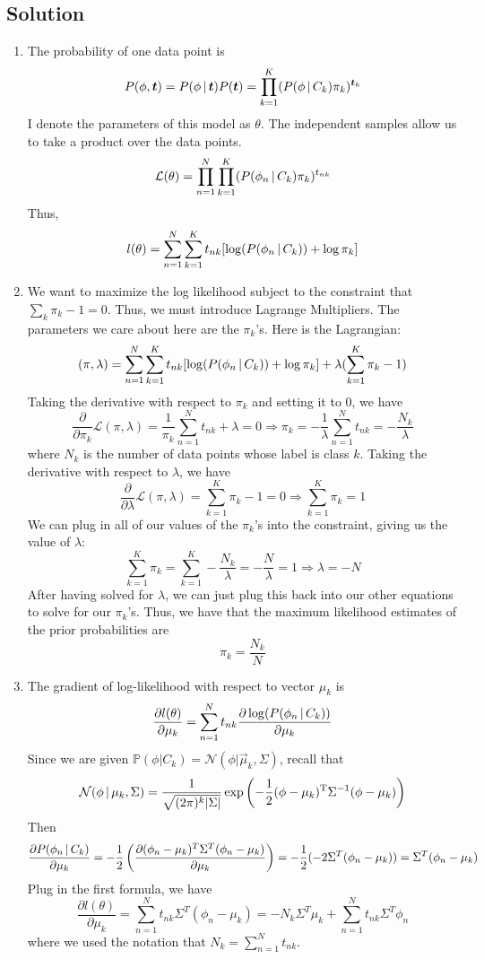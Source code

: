 \documentclass[submit]{harvardml}
\begin{document}
\subsection*{Solution}
\begin{enumerate}
    \item The probability of one data point is
    $$ P(\phi, \boldsymbol{t}) = P(\phi \,|\, \boldsymbol{t}) P(\boldsymbol{t}) = \prod_{k=1}^K (P(\phi \,|\, C_k) \pi_k)^{\boldsymbol{t}_k} $$
    I denote the parameters of this model as $\theta$. The independent samples allow us to take a product over the data points.
    $$ \mathcal{L}(\theta) = \prod_{n=1}^{N}\prod_{k=1}^K (P(\phi_n \,|\, C_k) \pi_k)^{t_{nk}} $$
    Thus,
    $$ l(\theta) = \sum_{n=1}^{N} \sum_{k=1}^K t_{nk} [\log(P(\phi_n \,|\, C_k)) + \log\pi_k] $$
    
    \item We want to maximize the log likelihood subject to the constraint that $\sum_k\pi_k - 1 = 0$. Thus, we must introduce Lagrange Multipliers. The parameters we care about here are the $\pi_k$'s. Here is the Lagrangian:
    $$ \mathcal(\pi, \lambda) = \sum_{n=1}^{N} \sum_{k=1}^K t_{nk} [\log(P(\phi_n \,|\, C_k)) + \log\pi_k] + \lambda(\sum_{k=1}^K\pi_k - 1) $$
    Taking the derivative with respect to $\pi_k$ and setting it to 0, we have
    $$ \frac{\partial}{\partial \pi_k} \mathcal{L}(\pi, \lambda) = \frac{1}{\pi_k} \sum_{n=1}^N t_{nk} + \lambda = 0 \Rightarrow \pi_k = -\frac{1}{\lambda} \sum_{n=1}^N t_{nk} = -\frac{N_k}{\lambda} $$
    where $N_k$ is the number of data points whose label is class $k$. Taking the derivative with respect to $\lambda$, we have
    $$ \frac{\partial}{\partial \lambda} \mathcal{L}(\pi,\lambda) = \sum_{k=1}^K \pi_k - 1 = 0 \Rightarrow \sum_{k=1}^K \pi_k = 1 $$
    We can plug in all of our values of the $\pi_k$'s into the constraint, giving us the value of $\lambda$:
    $$ \sum_{k=1}^K \pi_k = \sum_{k=1}^K - \frac{N_k}{\lambda} = -\frac{N}{\lambda} = 1 \Rightarrow \lambda = -N $$
    After having solved for $\lambda$, we can just plug this back into our other equations to solve for our $\pi_k$'s. Thus, we have that the maximum likelihood estimates of the prior probabilities are
    $$ \pi_k = \frac{N_k}{N} $$
    
    \item The gradient of log-likelihood with respect to vector $\mu_k$ is 
    $$ \frac{\partial l(\theta)}{\partial \mu_k} = \sum_{n=1}^{N} t_{nk} \frac{\partial \log(P(\phi_n \,|\, C_k))}{\partial \mu_k} $$
    Since we are given $\mathbb{P}(\phi | C_k) = \mathcal{N}(\phi | \vec \mu_k, \Sigma)$, recall that
    $$ \mathcal{N}(\phi \,|\, \mu_k, \Sigma) = \frac{1}{\sqrt{(2\pi)^k|\Sigma|}}  \exp\left(-\frac{1}{2} (\phi - \mu_k)^{\rm T} \Sigma^{-1} (\phi-\mu_k)\right) $$
    Then 
    $$ \frac{\partial P(\phi_n \,|\, C_k)}{\partial \mu_k} = -\frac{1}{2} \left( \frac{\partial(\phi_n - \mu_k)^T\Sigma^T(\phi_n - \mu_k)}{\partial\mu_k} \right) = -\frac{1}{2} (-2\Sigma^T(\phi_n-\mu_k)) = \Sigma^T(\phi_n-\mu_k) $$ 
    Plug in the first formula, we have
    $$ \frac{\partial l(\theta)}{\partial \mu_k} = \sum_{n=1}^N t_{nk} \Sigma^T(\phi_n-\mu_k) = - N_k\Sigma^T\mu_k + \sum_{n=1}^N t_{nk}\Sigma^T\phi_n  $$
    where we used the notation that $ N_k = \sum_{n=1}^N t_{nk} $.
    

\end{enumerate}
\end{document}
